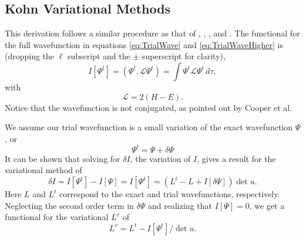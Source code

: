 \documentclass[preprint,showpacs,preprintnumbers,amsmath,amssymb]{revtex4}
\newcommand{\beq}{\begin{equation}}
\newcommand{\eeq}{\end{equation}}
\begin{document}
\subsection{Kohn Variational Methods}
\label{sec:Kohn}

This derivation follows a similar procedure as that of \cite{Lucchese1989}, \cite{Cooper2010}, \cite{Armour1991}, and \cite{VanReethThesis}.
The functional for the full wavefunction in equations \ref{eq:TrialWave} and \ref{eq:TrialWaveHigher} is (dropping the $\ell$ subscript and the $\pm$ superscript for clarity),
\begin{equation}
I[\Psi^t] = \left(\Psi^t, \mathcal{L} \Psi^t \right) = \int \Psi^t \mathcal{L} \Psi^t \,d\tau,
\label{eq:IlDefPsi}
\end{equation}
with
\beq
\mathcal{L} = 2(H - E).
\label{eq:LDef}
\eeq
Notice that the wavefunction is not conjugated, as pointed out by Cooper et al. \cite{Cooper2010}

We assume our trial wavefunction is a small variation of the exact wavefunction $\Psi$, or
\beq
\Psi^t = \Psi + \delta \Psi
\label{eq:PsiTrialRelation}
\eeq
It can be shown that solving for $\delta I$, the variation of $I$, gives a result for the variational method of
\beq
\delta I = I[\Psi^t] - I[\Psi] = I[\Psi^t] = (L^t - L + I[\delta \Psi]) \det u.
\label{eq:IlPsiVariation}
\eeq
Here $L$ and $L^t$ correspond to the exact and trial wavefunctions, respectively. Neglecting the second order term in $\delta \Psi$ and realizing that $I[\Psi] = 0$, we get a functional for the variational $L^v$ of
\beq
L^v = L^t - I[\Psi^t] / \det u.
\label{eq:ComplexKohnVariation}
\eeq
\end{document}
